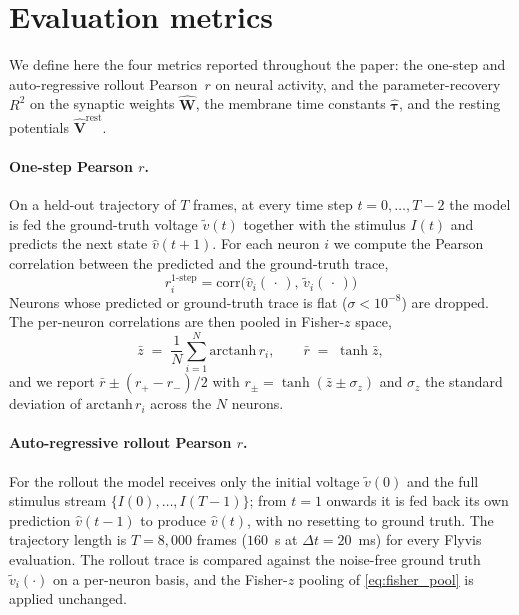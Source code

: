 \documentclass{article}
\begin{document}



\section{Evaluation metrics}
\label{app:metrics}

We define here the four metrics reported throughout the paper: the
one-step and auto-regressive rollout Pearson~$r$ on neural activity,
and the parameter-recovery $R^2$ on the synaptic weights
$\hat{\mathbf{W}}$, the membrane time constants
$\hat{\boldsymbol{\tau}}$, and the resting potentials
$\hat{\mathbf{V}}^{\mathrm{rest}}$.

\paragraph{One-step Pearson $r$.}
On a held-out trajectory of $T$ frames, at every time step
$t = 0, \ldots, T-2$ the model is fed the ground-truth voltage
$\tilde v(t)$ together with the stimulus $I(t)$ and predicts the next
state $\hat v(t+1)$. For each neuron $i$ we compute the Pearson
correlation between the predicted and the ground-truth trace,
\begin{equation}
r_i^{\mathrm{1\text{-}step}} = \mathrm{corr}\!\big(\hat v_i(\,\cdot\,),\,\tilde v_i(\,\cdot\,)\big)
\end{equation}
Neurons whose predicted or ground-truth trace is flat
($\sigma < 10^{-8}$) are dropped. The per-neuron correlations are
then pooled in Fisher-$z$ space,
\begin{equation}
    \bar z \;=\; \frac{1}{N}\sum_{i=1}^{N}\mathrm{arctanh}\,r_i,
    \qquad
    \bar r \;=\; \tanh\bar z,
    \label{eq:fisher_pool}
\end{equation}
and we report $\bar r \pm (r_+ - r_-)/2$ with
$r_\pm = \tanh(\bar z \pm \sigma_z)$ and $\sigma_z$ the standard
deviation of $\mathrm{arctanh}\,r_i$ across the $N$ neurons.

\paragraph{Auto-regressive rollout Pearson $r$.}
For the rollout the model receives only the initial voltage
$\tilde v(0)$ and the full stimulus stream
$\{I(0),\ldots,I(T-1)\}$; from $t = 1$ onwards it is fed back its own
prediction $\hat v(t-1)$ to produce $\hat v(t)$, with no resetting to
ground truth. The trajectory length is $T = 8{,}000$ frames
($160$~s at $\Delta t = 20$~ms) for every Flyvis evaluation. The
rollout trace is compared against the noise-free ground truth
$\tilde v_i(\cdot)$ on a per-neuron basis, and the Fisher-$z$ pooling
of \cref{eq:fisher_pool} is applied unchanged.
\end{document}
